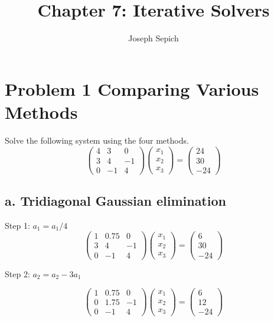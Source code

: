 \documentclass[]{article}
\title{Chapter 7: Iterative Solvers}
\subtitle{Joseph Sepich}
\author{}
\date{}
\begin{document}
\maketitle

{
\setcounter{tocdepth}{2}
\tableofcontents
}
\hypertarget{problem-1-comparing-various-methods}{%
\section{Problem 1 Comparing Various
Methods}\label{problem-1-comparing-various-methods}}

Solve the following system using the four methods. \[
\left(\begin{array}{ccc} 
4 & 3 & 0\\
3 & 4 & -1\\
0 & -1 & 4
\end{array}\right)
\left(\begin{array}{c} 
x_1 \\
x_2 \\
x_3
\end{array}\right) =
\left(\begin{array}{c}
24 \\
30 \\
-24
\end{array}\right)
\]

\hypertarget{a.-tridiagonal-gaussian-elimination}{%
\subsection{a. Tridiagonal Gaussian
elimination}\label{a.-tridiagonal-gaussian-elimination}}

Step 1: \(a_1 = a_1 / 4\) \[
\left(\begin{array}{ccc} 
1 & 0.75 & 0\\
3 & 4 & -1\\
0 & -1 & 4
\end{array}\right)
\left(\begin{array}{c} 
x_1 \\
x_2 \\
x_3
\end{array}\right) =
\left(\begin{array}{c}
6 \\
30 \\
-24
\end{array}\right)
\]

Step 2: \(a_2 = a_2 - 3a_1\)

\[
\left(\begin{array}{ccc} 
1 & 0.75 & 0\\
0 & 1.75 & -1\\
0 & -1 & 4
\end{array}\right)
\left(\begin{array}{c} 
x_1 \\
x_2 \\
x_3
\end{array}\right) =
\left(\begin{array}{c}
6 \\
12 \\
-24
\end{array}\right)
\]
\end{document}
